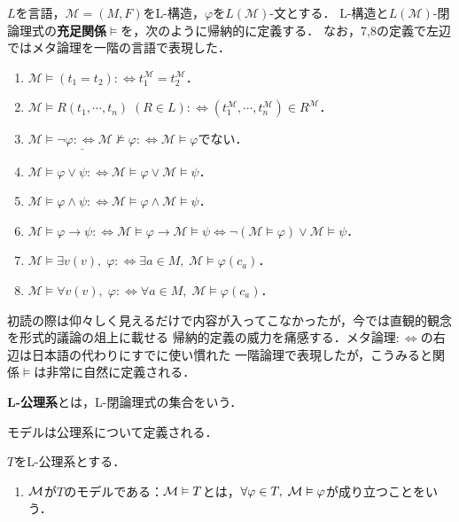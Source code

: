 \documentclass[uplatex, 12pt, dvipdfmx]{jsreport}
\begin{document}
\begin{definition}
    $L$を言語，$\mathcal{M}=(M,F)$をL-構造，$\varphi$を$L(\mathcal{M})$-文とする．
    L-構造と$L(\mathcal{M})$-閉論理式の\textbf{充足関係}$\vDash$を，次のように帰納的に定義する．
    なお，7,8の定義で左辺ではメタ論理を一階の言語で表現した．
    \begin{enumerate}
        \item $\mathcal{M}\vDash(t_1=t_2):\Leftrightarrow t^\mathcal{M}_1=t_2^\mathcal{M}$．
        \item $\mathcal{M}\vDash R(t_1,\cdots,t_n)\;(R\in L):\Leftrightarrow (t_1^\mathcal{M},\cdots,t_n^\mathcal{M})\in R^\mathcal{M}$．
        \item $\underline{\mathcal{M}\vDash\lnot\varphi:\Leftrightarrow\mathcal{M}\nvDash\varphi}:\Leftrightarrow\mathcal{M}\vDash\varphi$でない．
        \item $\mathcal{M}\vDash\varphi\lor\psi:\Leftrightarrow\mathcal{M}\vDash\varphi\lor\mathcal{M}\vDash\psi$．
        \item $\mathcal{M}\vDash\varphi\land\psi:\Leftrightarrow\mathcal{M}\vDash\varphi\land\mathcal{M}\vDash\psi$．
        \item $\mathcal{M}\vDash\varphi\to\psi:\Leftrightarrow\mathcal{M}\vDash\varphi\to\mathcal{M}\vDash\psi\Leftrightarrow\lnot(\mathcal{M}\vDash\varphi)\lor\mathcal{M}\vDash\psi$．
        \item $\mathcal{M}\vDash\exists v(v),\;\varphi:\Leftrightarrow\exists a\in M,\; \mathcal{M}\vDash\varphi(c_a)$．
        \item $\mathcal{M}\vDash\forall v(v),\;\varphi:\Leftrightarrow\forall a\in M,\; \mathcal{M}\vDash\varphi(c_a)$．
    \end{enumerate}
\end{definition}
\begin{remark}
    初読の際は仰々しく見えるだけで内容が入ってこなかったが，今では直観的観念を形式的議論の俎上に載せる
    帰納的定義の威力を痛感する．メタ論理$:\Leftrightarrow$の右辺は日本語の代わりにすでに使い慣れた
    一階論理で表現したが，こうみると関係$\vDash$は非常に自然に定義される．
\end{remark}

\begin{definition}[theory]
    \textbf{L-公理系}とは，L-閉論理式の集合をいう．
\end{definition}

モデルは公理系について定義される．

\begin{definition}[model]
    $T$をL-公理系とする．
    \begin{enumerate}
        \item $\mathcal{M}$が$T$のモデルである：$\mathcal{M}\vDash T$とは，$\forall\varphi\in T,\; \mathcal{M}\vDash\varphi$が成り立つことをいう．
    \end{enumerate}
\end{definition}
\end{document}
